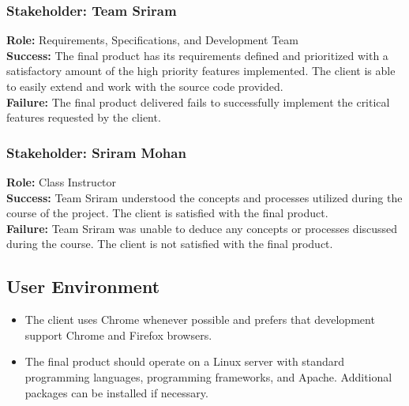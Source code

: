 \documentclass{article}
\begin{document}
\subsubsection{Stakeholder: Team Sriram}
\textbf{Role:} Requirements, Specifications, and Development Team\\
\textbf{Success:} The final product has its requirements defined and prioritized with a satisfactory amount of the high priority features implemented.  The client is able to easily extend and work with the source code provided.\\
\textbf{Failure:} The final product delivered fails to successfully implement the critical features requested by the client.

\subsubsection{Stakeholder: Sriram Mohan}
\textbf{Role:} Class Instructor\\
\textbf{Success:} Team Sriram understood the concepts and processes utilized during the course of the project. The client is satisfied with the final product.\\
\textbf{Failure:} Team Sriram was unable to deduce any concepts or processes discussed during the course. The client is not satisfied with the final product.

\subsection{User Environment}
\begin{itemize}
\item The client uses Chrome whenever possible and prefers that development support Chrome and Firefox browsers.
\item The final product should operate on a Linux server with standard programming languages, programming frameworks, and Apache.  Additional packages can be installed if necessary.
\end{itemize}
\end{document}
